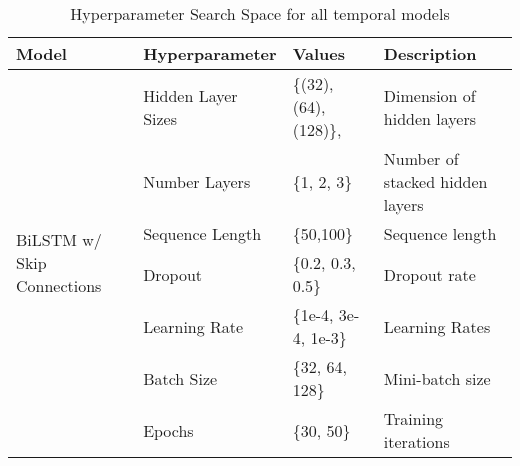 \documentclass{article}
\begin{document}
\begin{table}[htbp]
    \centering
    \caption{Hyperparameter Search Space for all temporal models}
    \begin{tabular}{llll}
        \toprule
        \textbf{Model}                                 & \textbf{Hyperparameter} & \textbf{Values}        & \textbf{Description}            \\
        \midrule
        \multirow{7}{*}{BiLSTM w/ Skip Connections}    & Hidden Layer Sizes      & \{(32), (64), (128)\}, & Dimension of hidden layers      \\
                                                       & Number Layers           & \{1, 2, 3\}            & Number of stacked hidden layers \\
                                                       & Sequence Length         & \{50,100\}             & Sequence length                 \\
                                                       & Dropout                 & \{0.2, 0.3, 0.5\}      & Dropout rate                    \\
                                                       & Learning Rate           & \{1e-4, 3e-4, 1e-3\}   & Learning Rates                  \\
                                                       & Batch Size              & \{32, 64, 128\}        & Mini-batch size                 \\
                                                       & Epochs                  & \{30, 50\}             & Training iterations             \\


\end{tabular}
\end{table}
\end{document}
